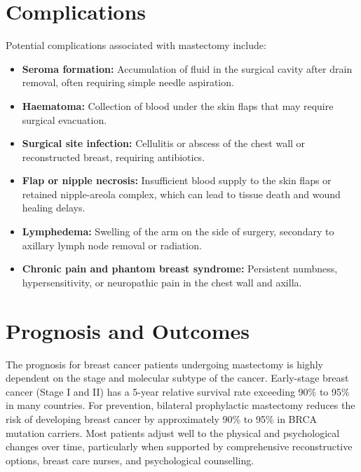 \section*{Complications}
Potential complications associated with mastectomy include:
\begin{itemize}
    \item \textbf{Seroma formation:} Accumulation of fluid in the surgical cavity after drain removal, often requiring simple needle aspiration.
    \item \textbf{Haematoma:} Collection of blood under the skin flaps that may require surgical evacuation.
    \item \textbf{Surgical site infection:} Cellulitis or abscess of the chest wall or reconstructed breast, requiring antibiotics.
    \item \textbf{Flap or nipple necrosis:} Insufficient blood supply to the skin flaps or retained nipple-areola complex, which can lead to tissue death and wound healing delays.
    \item \textbf{Lymphedema:} Swelling of the arm on the side of surgery, secondary to axillary lymph node removal or radiation.
    \item \textbf{Chronic pain and phantom breast syndrome:} Persistent numbness, hypersensitivity, or neuropathic pain in the chest wall and axilla.
\end{itemize}

\section*{Prognosis and Outcomes}
The prognosis for breast cancer patients undergoing mastectomy is highly dependent on the stage and molecular subtype of the cancer. Early-stage breast cancer (Stage I and II) has a 5-year relative survival rate exceeding 90\% to 95\% in many countries. For prevention, bilateral prophylactic mastectomy reduces the risk of developing breast cancer by approximately 90\% to 95\% in BRCA mutation carriers. Most patients adjust well to the physical and psychological changes over time, particularly when supported by comprehensive reconstructive options, breast care nurses, and psychological counselling.

